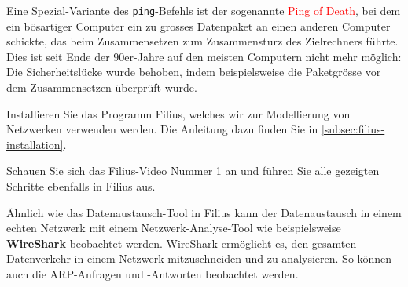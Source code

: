 \begin{mycaution}
	Eine Spezial-Variante des \texttt{ping}-Befehls ist der sogenannte \textcolor{red}{\faSkull{} Ping of Death}, bei dem ein bösartiger Computer ein zu grosses Datenpaket an einen anderen Computer schickte, das beim Zusammensetzen zum Zusammensturz des Zielrechners führte. Dies ist seit Ende der 90er-Jahre auf den meisten Computern nicht mehr möglich: Die Sicherheitslücke wurde behoben, indem beispielsweise die Paketgrösse vor dem Zusammensetzen überprüft wurde.
\end{mycaution}

\begin{myexercise}
	Installieren Sie das Programm Filius, welches wir zur Modellierung von Netzwerken verwenden werden. Die Anleitung dazu finden Sie in \cref{subsec:filius-installation}.
\end{myexercise}

\begin{myexercise}
	Schauen Sie sich das \href{https://www.youtube.com/watch?v=Kn8v_HrckUM&list=PLUfZiVdJui-57k0VcRecHX0JTEhOMgiKP}{Filius-Video Nummer 1} an und führen Sie alle gezeigten Schritte ebenfalls in Filius aus.
\end{myexercise}

Ähnlich wie das Datenaustausch-Tool in Filius kann der Datenaustausch in einem echten Netzwerk mit einem Netzwerk-Analyse-Tool wie beispielsweise \textbf{WireShark} beobachtet werden. WireShark ermöglicht es, den gesamten Datenverkehr in einem Netzwerk mitzuschneiden und zu analysieren. So können auch die \gls{ARP}-Anfragen und -Antworten beobachtet werden.

